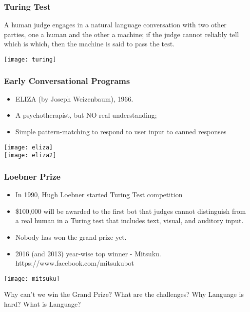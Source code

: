 \begin{frame}[fragile]\frametitle{Turing Test}

A human judge engages in a natural language conversation with two other parties, one a human and the other a machine; if the judge cannot reliably tell which is which, then the machine is said to pass the test. 

\begin{center}
\texttt{[image: turing]}
\end{center}

\end{frame}

\begin{frame}[fragile]\frametitle{Early Conversational Programs}
	\begin{itemize}
	\item ELIZA (by Joseph Weizenbaum), 1966. 
	\item A psychotherapist, but NO real understanding; 
	\item Simple pattern-matching to respond to user input to canned responses
	\end{itemize}

\begin{center}
\texttt{[image: eliza]}\\
\texttt{[image: eliza2]}
\end{center}

\end{frame}

\begin{frame}[fragile]\frametitle{Loebner Prize }

	\begin{itemize}
	\item In 1990, Hugh Loebner started Turing Test competition 
	\item \$100,000 will be awarded to the first bot that judges cannot distinguish from a real human in a Turing test that includes text, visual, and auditory input.
	\item Nobody has won the grand prize yet.
	\item 2016 (and 2013) year-wise top winner - Mitsuku. https://www.facebook.com/mitsukubot 
	\end{itemize}

\begin{center}
\texttt{[image: mitsuku]}
\end{center}

Why can't we win the Grand Prize? What are the challenges? Why Language is hard? What is Language?
\end{frame}

